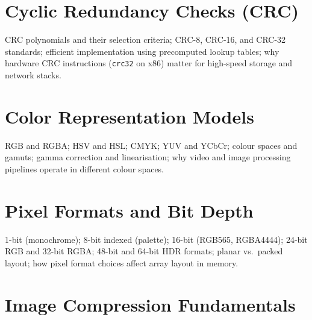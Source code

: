 \chapter{Cyclic Redundancy Checks (CRC)}
\label{ch:crc}

CRC polynomials and their selection criteria; CRC-8, CRC-16, and CRC-32
standards; efficient implementation using precomputed lookup tables; why
hardware CRC instructions (\texttt{crc32} on x86) matter for high-speed
storage and network stacks.


%
%
%

\chapter{Color Representation Models}
\label{ch:color-models}

RGB and RGBA; HSV and HSL; CMYK; YUV and YCbCr; colour spaces and gamuts;
gamma correction and linearisation; why video and image processing pipelines
operate in different colour spaces.

\chapter{Pixel Formats and Bit Depth}
\label{ch:pixel-formats}

1-bit (monochrome); 8-bit indexed (palette); 16-bit (RGB565, RGBA4444);
24-bit RGB and 32-bit RGBA; 48-bit and 64-bit HDR formats; planar vs.\
packed layout; how pixel format choices affect array layout in memory.

\chapter{Image Compression Fundamentals}
\label{ch:image-compression}


